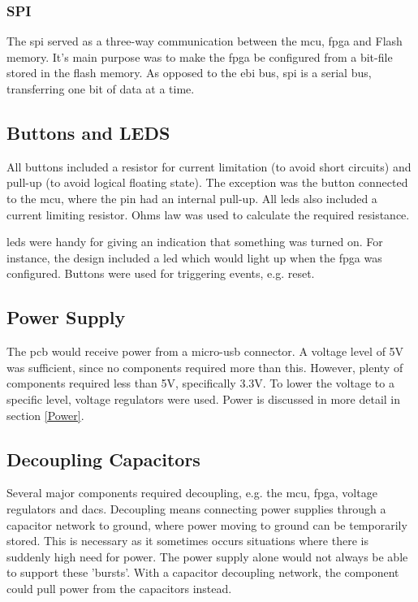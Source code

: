 \subsubsection{SPI}
The \gls{spi} served as a three-way communication between the \gls{mcu}, \gls{fpga} and Flash memory.
It's main purpose was to make the \gls{fpga} be configured from a bit-file stored in the flash memory.
As opposed to the \gls{ebi} bus, \gls{spi} is a serial bus, transferring one bit of data at a time.

\subsection{Buttons and LEDS}
All buttons included a resistor for current limitation (to avoid short circuits) and pull-up (to avoid logical floating state).
The exception was the button connected to the \gls{mcu}, where the pin had an internal pull-up.
All \gls{led}s also included a current limiting resistor.
Ohms law was used to calculate the required resistance\cite{ohm}.

\gls{led}s were handy for giving an indication that something was turned on.
For instance, the design included a \gls{led} which would light up when the \gls{fpga} was configured.
Buttons were used for triggering events, e.g. reset.

\subsection{Power Supply}
The \gls{pcb} would receive power from a micro-\gls{usb} connector.
A voltage level of 5V was sufficient, since no components required more than this.
However, plenty of components required less than 5V, specifically 3.3V.
To lower the voltage to a specific level, voltage regulators were used.
Power is discussed in more detail in section \ref{Power}.

\subsection{Decoupling Capacitors}
Several major components required decoupling, e.g. the \gls{mcu}, \gls{fpga}, voltage regulators and \gls{dac}s.
Decoupling means connecting power supplies through a capacitor network to ground, where power moving to ground can be temporarily stored.
This is necessary as it sometimes occurs situations where there is suddenly high need for power.
The power supply alone would not always be able to support these 'bursts'.
With a capacitor decoupling network, the component could pull power from the capacitors instead.


